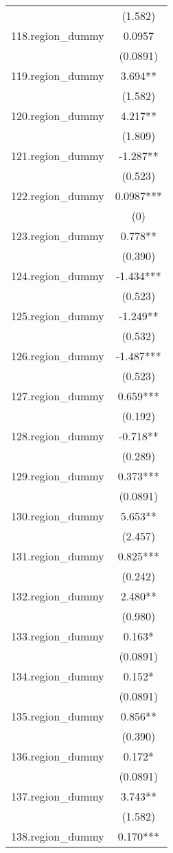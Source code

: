 \documentclass[]{article}
\begin{document}
\begin{tabular}{lc}
 & (1.582) \\
118.region\_dummy & 0.0957 \\
 & (0.0891) \\
119.region\_dummy & 3.694** \\
 & (1.582) \\
120.region\_dummy & 4.217** \\
 & (1.809) \\
121.region\_dummy & -1.287** \\
 & (0.523) \\
122.region\_dummy & 0.0987*** \\
 & (0) \\
123.region\_dummy & 0.778** \\
 & (0.390) \\
124.region\_dummy & -1.434*** \\
 & (0.523) \\
125.region\_dummy & -1.249** \\
 & (0.532) \\
126.region\_dummy & -1.487*** \\
 & (0.523) \\
127.region\_dummy & 0.659*** \\
 & (0.192) \\
128.region\_dummy & -0.718** \\
 & (0.289) \\
129.region\_dummy & 0.373*** \\
 & (0.0891) \\
130.region\_dummy & 5.653** \\
 & (2.457) \\
131.region\_dummy & 0.825*** \\
 & (0.242) \\
132.region\_dummy & 2.480** \\
 & (0.980) \\
133.region\_dummy & 0.163* \\
 & (0.0891) \\
134.region\_dummy & 0.152* \\
 & (0.0891) \\
135.region\_dummy & 0.856** \\
 & (0.390) \\
136.region\_dummy & 0.172* \\
 & (0.0891) \\
137.region\_dummy & 3.743** \\
 & (1.582) \\
138.region\_dummy & 0.170*** \\

\end{tabular}
\end{document}
